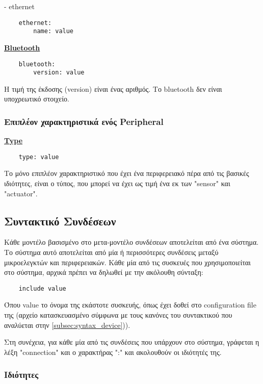 - ethernet

\begin{lstlisting}
	ethernet:
		name: value
\end{lstlisting}

\textbf{\underline{Bluetooth}}

\begin{lstlisting}
	bluetooth:
		version: value
\end{lstlisting}

Η τιμή της έκδοσης (version) είναι ένας αριθμός. Το bluetooth δεν είναι υποχρεωτικό στοιχείο.

\subsubsection{Επιπλέον χαρακτηριστικά ενός Peripheral}

\textbf{\underline{Type}}

\begin{lstlisting}
	type: value
\end{lstlisting}

Το μόνο επιπλέον χαρακτηριστικό που έχει ένα περιφερειακό πέρα από τις βασικές ιδιότητες, είναι ο τύπος, που μπορεί να έχει ως τιμή ένα εκ των "sensor" και "actuator".

\subsection{Συντακτικό Συνδέσεων}
\label{subsec:syntax_connections}

Κάθε μοντέλο βασισμένο στο μετα-μοντέλο συνδέσεων αποτελείται από ένα σύστημα. Το σύστημα αυτό αποτελείται από μία ή περισσότερες συνδέσεις μεταξύ μικροελεγκτών και περιφερειακών. Κάθε μία από τις συσκευές που χρησιμοποιείται στο σύστημα, αρχικά πρέπει να δηλωθεί με την ακόλουθη σύνταξη:

\begin{lstlisting}
	include value
\end{lstlisting}

Όπου value το όνομα της εκάστοτε συσκευής, όπως έχει δοθεί στο configuration file της (αρχείο κατασκευασμένο σύμφωνα με τους κανόνες του συντακτικού που αναλύεται στην \autoref{subsec:syntax_device})).

Στη συνέχεια, για κάθε μία από τις συνδέσεις που υπάρχουν στο σύστημα, γράφεται η λέξη "connection" και ο χαρακτήρας ":" και ακολουθούν οι ιδιότητές της.

\subsubsection{Ιδιότητες}

